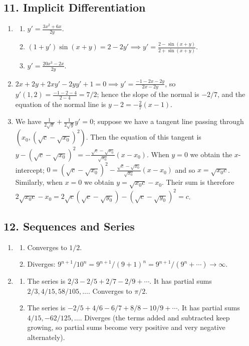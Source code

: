 \subsection*{11. Implicit Differentiation}
\begin{enumerate}
  \item
    \begin{enumerate}
      \item $ y' = \frac{3x^2 + 6x}{2y} $.
      \item $ (1 + y')\sin(x + y) = 2 - 2y' \implies y' = \frac{2 - \sin(x + y)}{2 + \sin(x + y)} $.
      \item $ y' = \frac{20x^3 - 2x}{2y} $.
    \end{enumerate}
  \item $ 2x + 2y + 2xy' - 2yy' + 1 = 0 \implies y' = \frac{-1 - 2x - 2y}{2x - 2y} $, so $ y'(1,2) = \frac{-1 - 2 - 4}{2 - 4} = 7/2 $; hence the
        slope of the normal is $ -2/7 $, and the equation of the normal line is $ y - 2 = -\frac{2}{7}(x - 1) $.
  \item We have $ \frac{1}{2\sqrt{x}} + \frac{1}{2\sqrt{y}} y' = 0 $; suppose we have a tangent line passing through $ (x_0, (\sqrt{c} - \sqrt{x_0})^2) $.
        Then the equation of this tangent is $ y - (\sqrt{c} - \sqrt{x_0})^2 = -\frac{\sqrt{c} - \sqrt{x_0}}{\sqrt{x_0}} (x - x_0) $.
        When $ y = 0 $ we obtain the $ x$-intercept; $ 0 = (\sqrt{c} - \sqrt{x_0})^2 -\frac{\sqrt{c} - \sqrt{x_0}}{\sqrt{x_0}} (x - x_0) $ and so $ x = \sqrt{x_0 c} $.
        Similarly, when $ x = 0 $ we obtain $ y = \sqrt{x_0 c} -  x_0 $. Their sum is therefore $ 2\sqrt{x_0 c} - x_0 = 2\sqrt{c}(\sqrt{c} - \sqrt{y_0}) - (\sqrt{c} - \sqrt{y_0})^2 = c $.
\end{enumerate}

\subsection*{12. Sequences and Series}
\begin{enumerate}
  \item
    \begin{enumerate}
      \item Converges to $1/2$.
      \item Diverges: $ 9^{n + 1}/10^n = 9^{n + 1}/(9 + 1)^n = 9^{n + 1}/(9^n + \cdots) \to \infty $.
    \end{enumerate}
  \item
    \begin{enumerate}
      \item The series is $ 2/3 - 2/5 + 2/7 - 2/9 + \cdots $. It has partial sums $ 2/3,4/15,58/105, \dots $. Converges to $ \pi/2 $.
      \item The series is $ -2/5 + 4/6 - 6/7 + 8/8 - 10/9 + \cdots $. It has partial sums $ 4/15,-62/125, \dots $. Diverges (the terms added and subtracted
            keep growing, so partial sums become very positive and very negative alternately).
    \end{enumerate}
\end{enumerate}

